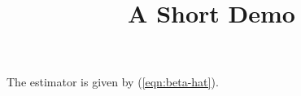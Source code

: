 \documentclass[article]{jss}
\title{A Short Demo}
\begin{document}
The estimator is given by (\ref{eqn:beta-hat}).
\end{document}
